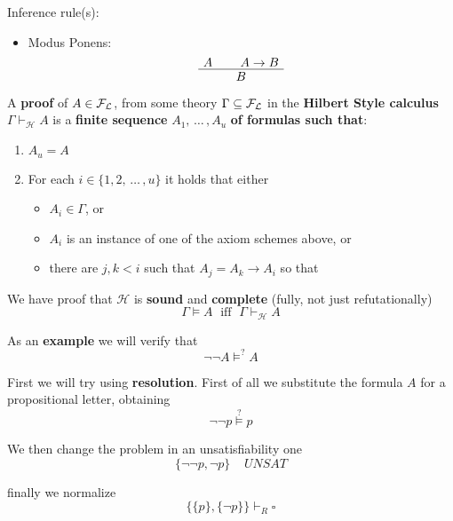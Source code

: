 Inference rule(s):
\begin{itemize}
	\item Modus Ponens: 
	$$
	\AxiomC{$A$}
	\AxiomC{$A \rightarrow B$}
	\BinaryInfC{$B$}
	\DisplayProof
	$$
\end{itemize}


\nn \nn

A \textbf{proof} of $A \in \mathcal{F}_\mathcal{L}$, from some theory $\Gamma \subseteq \mathcal{F}_\mathcal{L}$ in the \textbf{Hilbert Style calculus} $\Gamma \vdash_\mathcal{H} A$ is a \textbf{finite sequence} $A_1 , \, \dots \, , A_u$ \textbf{of formulas such that}:
\begin{enumerate}
	\item $A_u = A$
	\item For each $i \in \{1,2, \, \dots \, , u\}$ it holds that either 
	\begin{itemize}
		\item $A_i \in \Gamma$, or 
		\item $A_i$ is an instance of one of the axiom schemes above, or
		\item there are $j,k < i$ such that $A_j = A_k \rightarrow A_i$ so that
	\end{itemize}
\end{enumerate}

We have proof that $\mathcal{H}$ is \textbf{sound} and \textbf{complete} (fully, not just refutationally)
$$ \Gamma \models A \; \text{ iff } \; \Gamma \vdash_\mathcal{H} A $$

\newpage

As an \textbf{example} we will verify that 
$$ \neg \neg A \models^? A $$

%

First we will try using \textbf{resolution}. First of all we substitute the formula $A$ for a propositional letter, obtaining
$$ \neg \neg p \overset{?}{\vDash} p $$

We then change the problem in an unsatisfiability one
$$ \{\neg \neg p, \neg p\} \;\;\;\; UNSAT$$

finally we normalize
$$ \{\{p\}, \{\neg p\}\} \vdash_R \square $$

